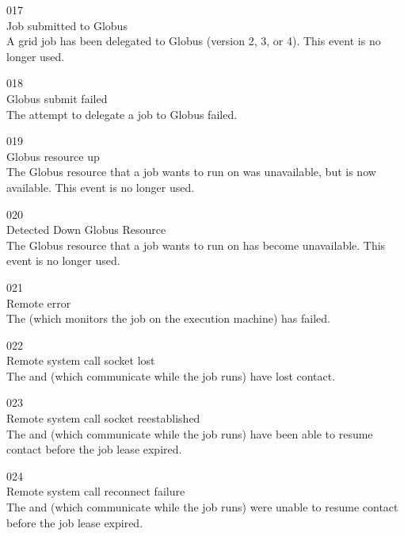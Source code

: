 \noindent{} 017 \\
 Job submitted to Globus \\
 A grid job has been delegated to Globus
(version 2, 3, or 4).
This event is no longer used.

\noindent{} 018 \\
 Globus submit failed \\
 The attempt to delegate a job to Globus
failed. 

\noindent{} 019 \\
 Globus resource up \\
 The Globus resource that a job wants to run
on was unavailable, but is now available.
This event is no longer used.

\noindent{} 020 \\
 Detected Down Globus Resource \\
 The Globus resource that a job wants to run
on has become unavailable. 
This event is no longer used.

\noindent{} 021 \\
 Remote error \\
 The  (which monitors the job
on the execution machine) has failed.

\noindent{} 022 \\
 Remote system call socket lost \\
 The  and 
(which communicate while the job runs) have lost contact.

\noindent{} 023 \\
 Remote system call socket reestablished \\
 The  and 
(which communicate while the job runs) have been able to resume
contact before the job lease expired.

\noindent{} 024 \\
 Remote system call reconnect failure \\
 The  and 
(which communicate while the job runs) were unable to resume
contact before the job lease expired.

